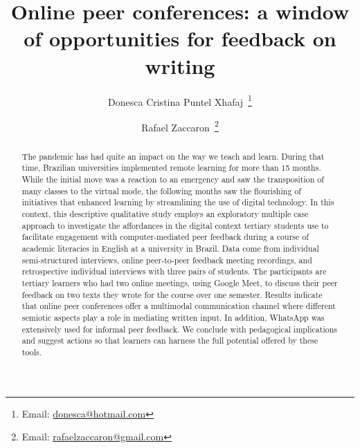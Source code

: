 \documentclass[english]{textolivre}
\title{Online peer conferences: a window of opportunities for feedback on writing}
\author[1]{Donesca Cristina Puntel Xhafaj~\orcid{0000-0002-2560-2919}\thanks{Email: \href{mailto:donesca@hotmail.com}{donesca@hotmail.com}}}
\author[1]{Rafael Zaccaron~\orcid{0000-0001-7796-501X}\thanks{Email: \href{mailto:rafaelzaccaron@gmail.com}{rafaelzaccaron@gmail.com}}}
\affil[1]{Universidade Federal de Santa Catarina, Centro de Comunicação e Expressão, Florianópolis, SC, Brasil.}
\begin{document}
\maketitle

\begin{polyabstract}
\begin{abstract}
The pandemic has had quite an impact on the way we teach and learn. During that time, Brazilian universities implemented remote learning for more than 15 months. While the initial move was a reaction to an emergency and saw the transposition of many classes to the virtual mode, the following months saw the flourishing of initiatives that enhanced learning by streamlining the use of digital technology. In this context, this descriptive qualitative study employs an exploratory multiple case approach to investigate the affordances in the digital context tertiary students use to facilitate engagement with computer-mediated peer feedback during a course of academic literacies in English at a university in Brazil. Data come from individual semi-structured interviews, online peer-to-peer feedback meeting recordings, and retrospective individual interviews with three pairs of students. The participants are tertiary learners who had two online meetings, using Google Meet, to discuss their peer feedback on two texts they wrote for the course over one semester. Results indicate that online peer conferences offer a multimodal communication channel where different semiotic aspects play a role in mediating written input. In addition, WhatsApp was extensively used for informal peer feedback. We conclude with pedagogical implications and suggest actions so that learners can harness the full potential offered by these tools.

\end{abstract}


\end{polyabstract}
\end{document}
